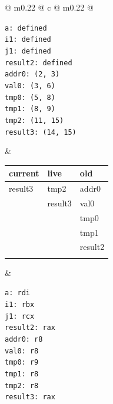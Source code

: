 \begin{figure}[H]
    \centering
    \small
    \begin{tabularx}{\textwidth}{@{} m{} @{\extracolsep{\fill}} c @{\extracolsep{\fill}} m{} @{}}
        \begin{tcolorbox}[standard jigsaw, opacityback=0, colframe=black, arc=4mm, width=\linewidth, height=6.2cm, valign=center, left=2pt, right=2pt]
            \texttt{\small a: defined \\ i1: defined \\ j1: defined \\ result2: defined \\ addr0: (2, 3) \\ val0: (3, 6) \\ tmp0: (5, 8) \\ tmp1: (8, 9) \\ tmp2: (11, 15) \\ result3: (14, 15)}
        \end{tcolorbox} 
        & 
        \renewcommand{\arraystretch}{1.3}
        \begin{tabular}{|p{2cm}|p{2cm}|p{2cm}|}
            \hline
            \textbf{current}  & \textbf{live} & \textbf{old} \\ \hline
             result3 & tmp2   & addr0 \\ \hline
                    & result3 & val0     \\ \hline
                    &         & tmp0     \\ \hline
                    &         & tmp1     \\ \hline
                    &         & result2  \\ \hline
            & & \\ \hline
        \end{tabular} 
        & 
        \begin{tcolorbox}[standard jigsaw, opacityback=0, colframe=black, arc=4mm, width=\linewidth, height=6.2cm, valign=center, left=2pt, right=2pt]
            \texttt{\small a: rdi \\ i1: rbx \\ j1: rcx \\ result2: rax \\ addr0: r8 \\ val0: r8 \\ tmp0: r9 \\ tmp1: r8 \\ tmp2: r8 \\ result3: rax}
        \end{tcolorbox} \\
    \end{tabularx}
\end{figure}

